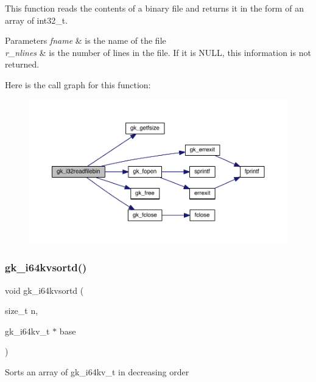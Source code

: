 This function reads the contents of a binary file and returns it in the form of an array of int32\+\_\+t. 
\begin{DoxyParams}{Parameters}
{\em fname} & is the name of the file \\
\hline
{\em r\+\_\+nlines} & is the number of lines in the file. If it is N\+U\+LL, this information is not returned. \\
\hline
\end{DoxyParams}
Here is the call graph for this function\+:\nopagebreak
\begin{figure}[H]
\begin{center}
\leavevmode
\includegraphics[width=350pt]{a00077_afbb9b4e2327d298a79924028441a0fdb_cgraph}
\end{center}
\end{figure}
\mbox{\label{a00077_aee24bdc162430cb1629fb52b14fa543d}} 
\subsubsection{\texorpdfstring{gk\+\_\+i64kvsortd()}{gk\_i64kvsortd()}}
{\footnotesize\ttfamily void gk\+\_\+i64kvsortd (\begin{DoxyParamCaption}\item[{size\+\_\+t}]{n,  }\item[{gk\+\_\+i64kv\+\_\+t $\ast$}]{base }\end{DoxyParamCaption})}

Sorts an array of gk\+\_\+i64kv\+\_\+t in decreasing order \mbox{\label{a00077_ac0b219fef58f0a3ba7019578ed04217e}} 
